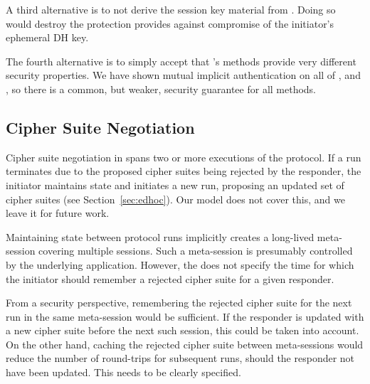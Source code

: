 \documentclass[runningheads, envcountsame, a4paper, draft, x11names]{llncs}
\begin{document}
A third alternative is to not derive the session key material from \mGiy{}.
%
Doing so would destroy the protection \mOptls{} provides against compromise
of the initiator's ephemeral DH key.
%

The fourth alternative is to simply
accept that \mEdhoc{}'s methods provide very different security properties.
%
We have shown mutual implicit authentication on all of \mGxy{}, \mGiy{} and
\mGrx{}, so there is a common, but weaker, security guarantee for all
methods.
%

 
\subsection{Cipher Suite Negotiation}
\label{sec:ciphersuiteNegotiation}
 
%
Cipher suite negotiation in \mEdhoc{} spans two or more executions of the
protocol.
%
If a run terminates due to the proposed cipher suites being rejected by the
responder, the initiator maintains state and initiates a new run, proposing
an updated set of cipher suites (see Section~\ref{sec:edhoc}).
%
Our model does not cover this, and we leave it for future work.

Maintaining state between protocol runs implicitly creates a long-lived
meta-session covering multiple \mEdhoc{} sessions.
%
Such a meta-session is presumably controlled by the underlying application.
%
However, the \mSpec{} does not specify the time for which the initiator should
remember a rejected cipher suite for a given responder.
%

From a security perspective, remembering the rejected cipher suite for the
next \mEdhoc{} run in the same meta-session would be sufficient.
%
If the responder is updated with a new cipher suite before the next such
session, this could be taken into account. On the other hand, caching the
rejected cipher suite between meta-sessions would reduce the number of
round-trips for subsequent runs, should the responder not have been updated.
%
This needs to be clearly specified.

 
\end{document}
